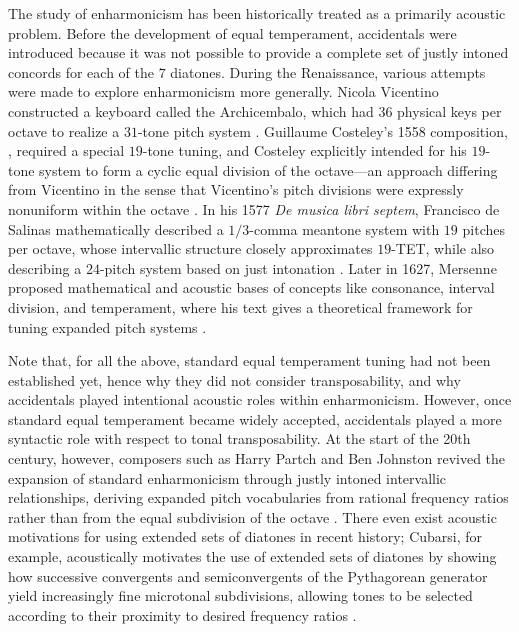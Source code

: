 \documentclass{article}
\theoremstyle{plain}
\theoremstyle{definition}
\theoremstyle{remark}
\begin{document}
The study of enharmonicism has been historically treated as a primarily acoustic problem. Before the development of equal temperament, accidentals were introduced because it was not possible to provide a complete set of justly intoned concords for each of the $7$ diatones. During the Renaissance, various attempts were made to explore enharmonicism more generally. Nicola Vicentino constructed a keyboard called the Archicembalo, which had $36$ physical keys per octave to realize a $31$-tone pitch system \cite{Vicentino}. Guillaume Costeley's 1558 composition, , required a special $19$-tone tuning, and Costeley explicitly intended for his $19$-tone system to form a cyclic equal division of the octave---an approach differing from Vicentino in the sense that Vicentino's pitch divisions were expressly nonuniform within the octave \cite{Costeley,Wibberley}. In his 1577 \textit{De musica libri septem}, Francisco de Salinas mathematically described a $1/3$-comma meantone system with $19$ pitches per octave, whose intervallic structure closely approximates $19$-TET, while also describing a $24$-pitch system based on just intonation \cite{Salinas}. Later in 1627, Mersenne proposed mathematical and acoustic bases of concepts like consonance, interval division, and temperament, where his text gives a theoretical framework for tuning expanded pitch systems \cite{Mersenne}.

Note that, for all the above, standard equal temperament tuning had not been established yet, hence why they did not consider transposability, and why accidentals played intentional acoustic roles within enharmonicism. However, once standard equal temperament became widely accepted, accidentals played a more syntactic role with respect to tonal transposability. At the start of the 20th century, however, composers such as Harry Partch and Ben Johnston revived the expansion of standard enharmonicism through justly intoned intervallic relationships, deriving expanded pitch vocabularies from rational frequency ratios rather than from the equal subdivision of the octave \cite{Partch,JohnstonProportionality,johnston_notation_2006}. There even exist acoustic motivations for using extended sets of diatones in recent history; Cubarsi, for example, acoustically motivates the use of extended sets of diatones by showing how successive convergents and semiconvergents of the Pythagorean generator yield increasingly fine microtonal subdivisions, allowing tones to be selected according to their proximity to desired frequency ratios \cite{Cubarsi}.
\end{document}

